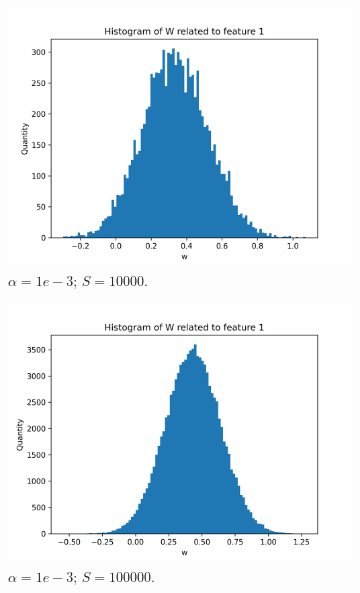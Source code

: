 \documentclass{article}
\begin{document}
\begin{figure}
\begin{subfigure}[t]{0.24\textwidth}
    \includegraphics[width=\linewidth]{hist_feat0_10000_sample_10000.png}
    \caption{$\alpha = 1e-3$; $S = 10000$.}
  \end{subfigure}
  \hfill
  \begin{subfigure}[t]{0.24\textwidth}
    \centering
    \includegraphics[width=\linewidth]{hist_feat0_10000_sample_100000.png}
    \caption{$\alpha = 1e-3$; $S = 100000$.}
  \end{subfigure}
  \begin{subfigure}[t]{0.24\textwidth}
    \centering

\end{subfigure}
\end{figure}
\end{document}
